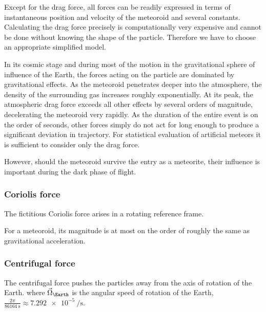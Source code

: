         Except for the drag force, all forces can be readily expressed in terms of instantaneous
        position and velocity of the meteoroid and several constants.
        Calculating the drag force precisely is computationally very expensive and cannot be done
        without knowing the shape of the particle. Therefore we have to choose an appropriate simplified model.

        In its cosmic stage and during most of the motion in the gravitational sphere of influence of the Earth,
        the forces acting on the particle are dominated by gravitational effects. As the meteoroid penetrates
        deeper into the atmosphere, the density of the surrounding gas increases roughly exponentially.
        At its peak, the atmospheric drag force exceeds all other effects by several orders of magnitude,
        decelerating the meteoroid very rapidly.
        As the duration of the entire event is on the order of seconds, other forces simply do not act for long enough
        to produce a significant deviation in trajectory. For statistical evaluation of artificial meteors
        it is sufficient to consider only the drag force.

        However, should the meteoroid survive the entry as a meteorite, their influence is important during the dark phase of flight.

        \subsubsection{Coriolis force} \label{saiC}
            The fictitious Coriolis force arises in a rotating reference frame.

            For a meteoroid, its magnitude is at most on the order of
            roughly the same as gravitational acceleration.

        \subsubsection{Centrifugal force} \label{saic}
            The centrifugal force pushes the particles away from the axis of rotation of the Earth.
            where $\vec{\Omega}_\Earth$ is the angular speed of rotation of the Earth,
            $\frac{2\pi}{\SI{86164}{\second}} \approx \SI{7.292e-5}{\per\second}$.

